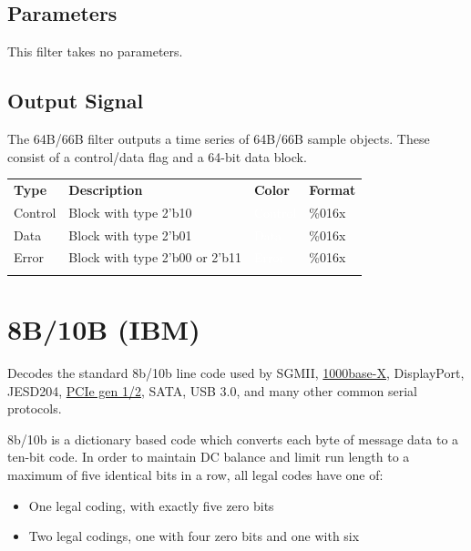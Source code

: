 \subsection{Parameters}

This filter takes no parameters.

\subsection{Output Signal}

The 64B/66B filter outputs a time series of 64B/66B sample objects. These consist of a control/data flag and
a 64-bit data block.

\begin{tabularx}{16cm}{lllX}
\thickhline
\textbf{Type} & \textbf{Description} & \textbf{Color} & \textbf{Format} \\
\thickhline
Control & Block with type 2'b10 & \cellcolor{control}\textcolor{white}{Control} & \%016x \\
\thickhline
Data & Block with type 2'b01 & \cellcolor{data}\textcolor{white}{Data} & \%016x \\
\thickhline
Error & Block with type 2'b00 or 2'b11 & \cellcolor{error}\textcolor{white}{Error} & \%016x \\
\thickhline
\end{tabularx}

\pagebreak
\section{8B/10B (IBM)}
\label{filter:8b10b}

Decodes the standard 8b/10b line code used by SGMII, \hyperref[filter:1000basex]{1000base-X}, DisplayPort, JESD204,
\hyperref[filter:pcie2_logical]{PCIe gen 1/2}, SATA, USB 3.0, and many other common serial protocols.

8b/10b is a dictionary based code which converts each byte of message data to a ten-bit code. In order to maintain DC
balance and limit run length to a maximum of five identical bits in a row, all legal codes have one of:
\begin{itemize}
\item One legal coding, with exactly five zero bits
\item Two legal codings, one with four zero bits and one with six
\end{itemize}


